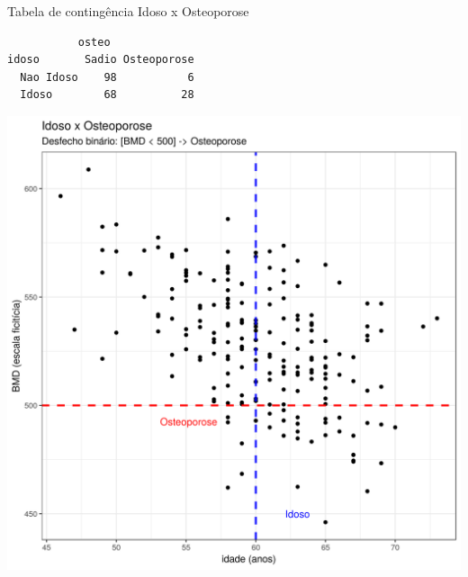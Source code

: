 \documentclass{beamer}
\begin{document}
\begin{frame}[fragile]{\scriptsize }
  \begin{exampleblock}{\small Tabela de contingência Idoso x Osteoporose}
    \tiny
\begin{verbatim}
           osteo
idoso       Sadio Osteoporose
  Nao Idoso    98           6
  Idoso        68          28
\end{verbatim}
  \end{exampleblock}
  \begin{center}
    \includegraphics[height=.6\textheight]{Cap31-32/pratica-glm4}
  \end{center}

\end{frame}
\end{document}

